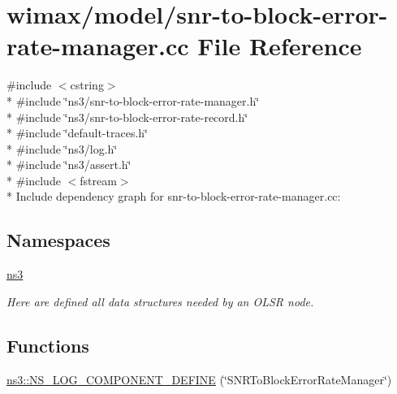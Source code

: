 \hypertarget{snr-to-block-error-rate-manager_8cc}{}\section{wimax/model/snr-\/to-\/block-\/error-\/rate-\/manager.cc File Reference}
\label{snr-to-block-error-rate-manager_8cc}
{\ttfamily \#include $<$cstring$>$}\\*
{\ttfamily \#include \char`\"{}ns3/snr-\/to-\/block-\/error-\/rate-\/manager.\+h\char`\"{}}\\*
{\ttfamily \#include \char`\"{}ns3/snr-\/to-\/block-\/error-\/rate-\/record.\+h\char`\"{}}\\*
{\ttfamily \#include \char`\"{}default-\/traces.\+h\char`\"{}}\\*
{\ttfamily \#include \char`\"{}ns3/log.\+h\char`\"{}}\\*
{\ttfamily \#include \char`\"{}ns3/assert.\+h\char`\"{}}\\*
{\ttfamily \#include $<$fstream$>$}\\*
Include dependency graph for snr-\/to-\/block-\/error-\/rate-\/manager.cc\+:
\subsection*{Namespaces}
\begin{DoxyCompactItemize}
\item 
 \hyperlink{namespacens3}{ns3}
\begin{DoxyCompactList}\small\item\em Here are defined all data structures needed by an O\+L\+SR node. \end{DoxyCompactList}\end{DoxyCompactItemize}
\subsection*{Functions}
\begin{DoxyCompactItemize}
\item 
\hyperlink{namespacens3_a63b3d0f2492b55d23928db803a1276f2}{ns3\+::\+N\+S\+\_\+\+L\+O\+G\+\_\+\+C\+O\+M\+P\+O\+N\+E\+N\+T\+\_\+\+D\+E\+F\+I\+NE} (\char`\"{}S\+N\+R\+To\+Block\+Error\+Rate\+Manager\char`\"{})
\end{DoxyCompactItemize}
